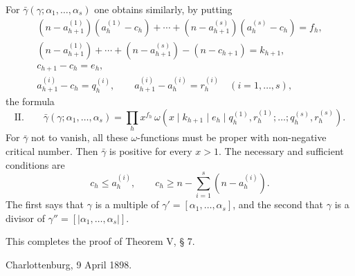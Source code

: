 \documentclass[11pt,a4paper]{article}
\begin{document}
For $\bar\gamma(\gamma;\alpha_1,
\ldots,\alpha_s)$ one obtains similarly, by putting
\[
\begin{gathered}
 (n-a_{h+1}^{(1)})(a_h^{(1)}-c_h)+\cdots+(n-a_{h+1}^{(s)})(a_h^{(s)}-c_h)=f_h,\\
 (n-a_{h+1}^{(1)})+\cdots+(n-a_{h+1}^{(s)})-(n-c_{h+1})=k_{h+1},\\
 c_{h+1}-c_h=e_h,\\
 a_{h+1}^{(i)}-c_h=q_h^{(i)},
 \qquad a_{h+1}^{(i)}-a_h^{(i)}=r_h^{(i)}\quad(i=1,\ldots,s),
\end{gathered}
\]
the formula
\[
\text{II.}\qquad
 \bar\gamma(\gamma;\alpha_1,
\ldots,\alpha_s)=\prod_h x^{f_h}\,
 \omega(x\mid k_{h+1}\mid e_h\mid q_h^{(1)},r_h^{(1)};\ldots;q_h^{(s)},r_h^{(s)}).
\]
For $\bar\gamma$ not to vanish, all these $\omega$-functions must be proper with non-negative critical number. Then $\bar\gamma$ is positive for every $x>1$. The necessary and sufficient conditions are
\[
 c_h\le a_h^{(i)},
 \qquad
 c_h\ge n-\sum_{i=1}^s(n-a_h^{(i)}).
\]
The first says that $\gamma$ is a multiple of $\gamma'=[\alpha_1,
\ldots,\alpha_s]$, and the second that $\gamma$ is a divisor of $\gamma''=[|\alpha_1,
\ldots,\alpha_s|]$.

This completes the proof of Theorem V, § 7.

Charlottenburg, 9 April 1898.
\end{document}
